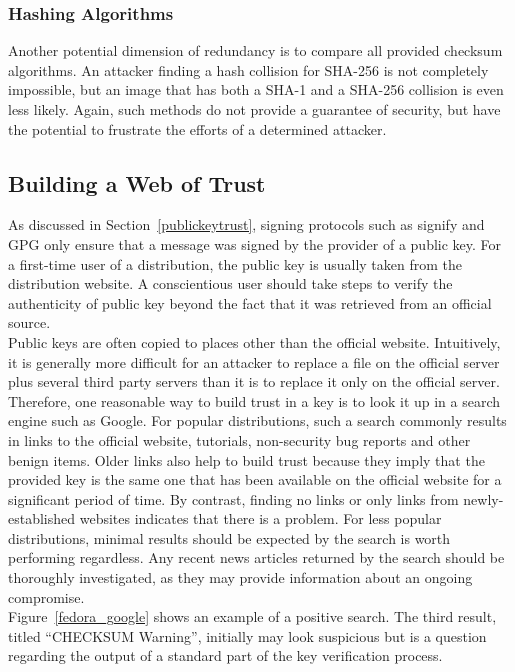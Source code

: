 \documentclass[conference]{IEEEtran}
\begin{document}
\subsubsection{Hashing Algorithms}
Another potential dimension of redundancy is to compare all provided checksum algorithms.
An attacker finding a hash collision for SHA-256 is not completely impossible, but an image
that has both a SHA-1 and a SHA-256 collision is even less likely. Again, such methods
do not provide a guarantee of security, but have the potential to frustrate the efforts of
a determined attacker.


\subsection{Building a Web of Trust}

As discussed in Section~\ref{publickeytrust}, signing protocols such as signify and GPG only
ensure that a message was signed by the provider of a public key. For a first-time user
of a distribution, the public key is usually taken from the distribution website.
A conscientious user should take steps to verify the authenticity of public key beyond the
fact that it was retrieved from an official source.\\
\indent Public keys are often copied to places
other than the official website. Intuitively, it is generally more difficult for an attacker
to replace a file on the official server plus several third party servers than it is to
replace it only on the official server. Therefore, one reasonable way to build trust in a
key is to look it up in a search engine such as Google. For popular distributions, such
a search commonly results in links to the official website, tutorials, non-security bug
reports and other benign items. Older links also help to build trust because they imply
that the provided key is the same one that has been available on the official website for
a significant period of time. By contrast, finding no links or only links from newly-
established websites indicates that there is a problem. For less popular distributions,
minimal results should be expected by the search is worth performing regardless. Any recent
news articles returned
by the search should be thoroughly investigated, as they may provide information about an
ongoing compromise.\\
\indent Figure~\ref{fedora_google} shows an example of a positive search. The
third result, titled ``CHECKSUM Warning'', initially may look suspicious but is a question
regarding the output of a standard part of the key verification process.
\end{document}

